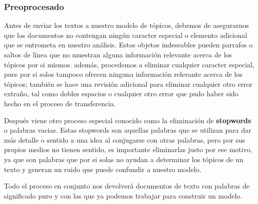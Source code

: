 \documentclass[
  spanish,
  letterpaper,
  DIV=11,
  numbers=noendperiod]{scrartcl}
\begin{document}
\subsubsection{Preoprocesado}\label{preoprocesado}

Antes de enviar los textos a nuestro modelo de tópicos, debemos de
asegurarnos que los documentos no contengan ningún caracter especial o
elemento adicional que se entrometa en nuestro análisis. Estos objetos
indeseables pueden parrafos o saltos de línea que no muestran alguna
información relevante acerca de los tópicos por si mismos. además,
procedemos a eliminar cualquier caracter especial, pues por si solos
tampoco ofrecen ninguna información relevante acerca de los tópicos;
también se hace una revisión adicional para eliminar cualquier otro
error extraño, tal como dobles espacios o cualquier otro error que pudo
haber sido hecho en el proceso de transferencia.

Después viene otro proceso especial conocido como la eliminación de
\textbf{stopwords} o palabras vacias. Estas stopwords son aquellas
palabras que se utilizan para dar más detalle o sentido a una idea al
conjugarse con otras palabras, pero por sus propios medios no tienen
sentido, es importante eliminarlas justo por ese motivo, ya que son
palabras que por si solas no ayudan a determinar los tópicos de un texto
y generan un ruido que puede confundir a nuestro modelo.

Todo el proceso en conjunto nos devolverá documentos de texto con
palabras de significado puro y con las que ya podemos trabajar para
construir un modelo.
\end{document}
